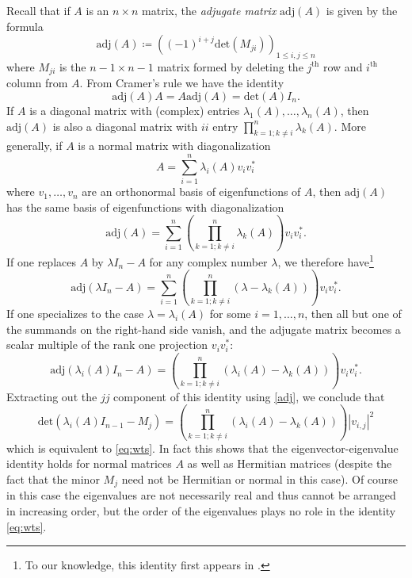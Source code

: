 \documentclass[12pt]{amsart}
\begin{document}
Recall that if $A$ is an $n \times n$ matrix, the \emph{adjugate matrix} $\mathrm{adj}(A)$ is given by the formula
\begin{equation}\label{adj}
 \mathrm{adj}( A ) \coloneqq \left( (-1)^{i+j} \mathrm{det}(M_{ji}) \right)_{1 \leq i, j \leq n}
\end{equation}
where $M_{ji}$ is the $n-1 \times n-1$ matrix formed by deleting the $j^{\mathrm{th}}$ row and $i^{\mathrm{th}}$ column from $A$.  From Cramer's rule we have the identity
$$ \mathrm{adj}( A ) A = A \mathrm{adj}( A ) = \mathrm{det}(A) I_n.$$
If $A$ is a diagonal matrix with (complex) entries $\lambda_1(A),\dots,\lambda_n(A)$, then $\mathrm{adj}(A)$ is also a diagonal matrix with $ii$ entry $\prod_{k=1; k \neq i}^n \lambda_k(A)$.  More generally, if $A$ is a normal matrix with diagonalization
\begin{equation}\label{adiag}
 A = \sum_{i=1}^n \lambda_i(A) v_i v_i^*
\end{equation}
where $v_1,\dots,v_n$ are an orthonormal basis of eigenfunctions of $A$, then $\mathrm{adj}(A)$ has the same basis of eigenfunctions with diagonalization
\begin{equation}\label{adja}
 \mathrm{adj}(A) = \sum_{i=1}^n (\prod_{k=1; k \neq i}^n \lambda_k(A)) v_i v_i^*.
\end{equation}
If one replaces $A$ by $\lambda I_n - A$ for any complex number $\lambda$, we therefore have\footnote{To our knowledge, this identity first appears in \cite[p. 157]{halmos}.}
$$ \mathrm{adj}(\lambda I_n - A) = \sum_{i=1}^n (\prod_{k=1; k \neq i}^n (\lambda - \lambda_k(A)) ) v_i v_i^*.$$
If one specializes to the case $\lambda = \lambda_i(A)$ for some $i=1,\dots,n$, then all but one of the summands on the right-hand side vanish, and the adjugate matrix becomes a scalar multiple of the rank one projection $v_i v_i^*$:
\begin{equation}\label{adji}
\mathrm{adj}(\lambda_i(A) I_n - A) = (\prod_{k=1; k \neq i}^n (\lambda_i(A) - \lambda_k(A)) ) v_i v_i^*.
\end{equation}
Extracting out the $jj$ component of this identity using \eqref{adj}, we conclude that
\begin{equation}\label{adji-2}
 \mathrm{det}(\lambda_i(A) I_{n-1} - M_j) = (\prod_{k=1; k \neq i}^n (\lambda_i(A) - \lambda_k(A)) ) |v_{i,j}|^2
\end{equation}
which is equivalent to \eqref{eq:wts}.  In fact this shows that the eigenvector-eigenvalue identity holds for normal matrices $A$ as well as Hermitian matrices (despite the fact that the minor $M_j$ need not be Hermitian or normal in this case).  Of course in this case the eigenvalues are not necessarily real and thus cannot be arranged in increasing order, but the order of the eigenvalues plays no role in the identity \eqref{eq:wts}.
\end{document}
